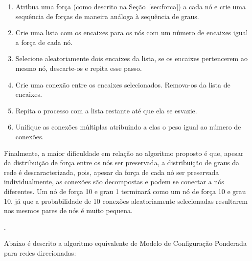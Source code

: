 \documentclass[12pt,a4paper,final]{article}
\begin{document}
\begin{enumerate}
\item Atribua uma força (como descrito na Seção~\ref{sec:forca}) a cada nó e crie uma sequência de forças de maneira análoga à sequência de graus.
\item Crie uma lista com os encaixes para os nós com um número de encaixes igual a força de cada nó.
\item Selecione aleatoriamente dois encaixes da lista, se os encaixes pertencerem ao mesmo nó, descarte-os e repita esse passo.
\item Crie uma conexão entre os encaixes selecionados. Remova-os da lista de encaixes.
\item Repita o processo com a lista restante até que ela se esvazie.
\item Unifique as conexões múltiplas atribuindo a elas o peso igual ao número de conexões.
\end{enumerate}


Finalmente, a maior dificuldade em relação ao algoritmo proposto é que, apesar da distribuição de força entre os nós ser preservada, a distribuição de graus da rede é descaracterizada, pois, apesar da força de cada nó ser preservada individualmente, as conexões são decompostas e podem se conectar a nós diferentes. Um nó de força 10 e grau 1 terminará como um nó de força 10 e grau 10, já que a probabilidade de 10 conexões aleatoriamente selecionadas resultarem nos mesmos pares de nós é muito pequena.

.

Abaixo é descrito a algoritmo equivalente de Modelo de Configuração Ponderada para redes direcionadas:
\end{document}
